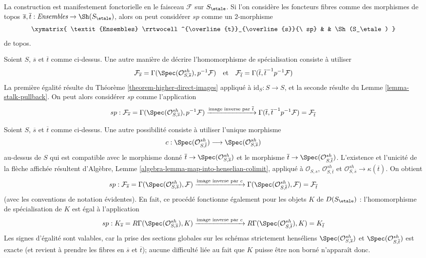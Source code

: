 \medskip\noindent
La construction est manifestement fonctorielle en le faisceau $\mathcal{F}$ sur
$S_\etale$. Si l'on considère les foncteurs fibres comme des morphismes de topos
$\overline{s}, \overline{t} : \textit{Ensembles} \to \Sh(S_\etale)$, alors
on peut considérer $sp$ comme un $2$-morphisme
$$
\xymatrix{
\textit{Ensembles}
\rrtwocell^{\overline{t}}_{\overline{s}}{\ sp}
&
&
\Sh(S_\etale)
}
$$
de topos.

\begin{remark}
\label{remark-alternative-sp}
Soient $S$, $\overline{s}$ et $\overline{t}$ comme ci-dessus.
Une autre manière de décrire l'homomorphisme de spécialisation consiste à utiliser
$$
\mathcal{F}_{\overline{s}} =
\Gamma(\Spec(\mathcal{O}^{sh}_{S, \overline{s}}), p^{-1}\mathcal{F})
\quad\text{et}\quad
\mathcal{F}_{\overline{t}} = \Gamma(\overline{t},
\overline{t}^{-1}p^{-1}\mathcal{F})
$$
La première égalité résulte du Théorème \ref{theorem-higher-direct-images}
appliqué à $\text{id}_S : S \to S$, et la seconde résulte
du Lemme \ref{lemma-stalk-pullback}. On peut alors considérer $sp$
comme l'application
$$
sp :
\mathcal{F}_{\overline{s}} =
\Gamma(\Spec(\mathcal{O}^{sh}_{S, \overline{s}}), p^{-1}\mathcal{F})
\xrightarrow{\text{image inverse par }\overline{t}}
\Gamma(\overline{t}, \overline{t}^{-1}p^{-1}\mathcal{F}) =
\mathcal{F}_{\overline{t}}
$$
\end{remark}

\begin{remark}
\label{remark-another-sp}
Soient $S$, $\overline{s}$ et $\overline{t}$ comme ci-dessus.
Une autre possibilité consiste à utiliser l'unique morphisme
$$
c :
\Spec(\mathcal{O}^{sh}_{S, \overline{t}})
\longrightarrow
\Spec(\mathcal{O}^{sh}_{S, \overline{s}})
$$
au-dessus de $S$ qui est compatible avec le morphisme donné
$\overline{t} \to \Spec(\mathcal{O}^{sh}_{S, \overline{s}})$
et le morphisme
$\overline{t} \to \Spec(\mathcal{O}^{sh}_{S, \overline{t}})$.
L'existence et l'unicité de la flèche affichée
résultent d'Algèbre, Lemme \ref{algebra-lemma-map-into-henselian-colimit},
appliqué à $\mathcal{O}_{S, s}$, $\mathcal{O}^{sh}_{S, \overline{t}}$ et
$\mathcal{O}^{sh}_{S, \overline{s}} \to \kappa(\overline{t})$.
On obtient
$$
sp :
\mathcal{F}_{\overline{s}} =
\Gamma(\Spec(\mathcal{O}^{sh}_{S, \overline{s}}), \mathcal{F})
\xrightarrow{\text{image inverse par }c}
\Gamma(\Spec(\mathcal{O}^{sh}_{S, \overline{t}}), \mathcal{F}) =
\mathcal{F}_{\overline{t}}
$$
(avec les conventions de notation évidentes).
En fait, ce procédé fonctionne également pour les objets $K$ de $D(S_\etale)$ :
l'homomorphisme de spécialisation de $K$ est égal à l'application
$$
sp :
K_{\overline{s}} =
R\Gamma(\Spec(\mathcal{O}^{sh}_{S, \overline{s}}), K)
\xrightarrow{\text{image inverse par }c}
R\Gamma(\Spec(\mathcal{O}^{sh}_{S, \overline{t}}), K) =
K_{\overline{t}}
$$
Les signes d'égalité sont valables, car la prise des sections globales sur
les schémas strictement henséliens
$\Spec(\mathcal{O}^{sh}_{S, \overline{s}})$ et
$\Spec(\mathcal{O}^{sh}_{S, \overline{t}})$
est exacte (et revient à prendre les fibres en $\overline{s}$ et $\overline{t}$);
aucune difficulté liée au fait que $K$ puisse être non borné
n'apparaît donc.
\end{remark}

